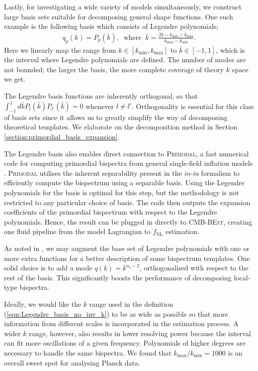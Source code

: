 Lastly, for investigating a wide variety of models simultaneously, we construct large basis sets suitable for decomposing general shape functions. One such example is the following basis which consists of Legendre polynomials;
\begin{align}
	q_p(k) = P_p(\bar{k}), \;\;\text{where}\;\; \bar{k} = \frac{2k-k_\text{min}-k_\text{max}}{k_\text{max}-k_\text{min}}.  \label{eqn:Legendre_basis_no_inv_k}
\end{align}
Here we linearly map the range from $k \in [k_\text{min},k_\text{max}]$ to $\bar{k} \in [-1,1]$, which is the interval where Legendre polynomials are defined. The number of modes are not bounded; the larger the basis, the more complete coverage of theory $k$ space we get.

The Legendre basis functions are inherently orthogonal, so that $\int_{-1}^{1} d\bar{k} P_{l}(\bar{k}) P_{l'}(\bar{k}) = 0$ whenever $l \neq l'$. Orthogonality is essential for this class of basis sets since it allows us to greatly simplify the way of decomposing theoretical templates. We elaborate on the decomposition method in Section \ref{section:primordial_basis_expansion}. 

The Legendre basis also enables direct connection to \textsc{Primodal}, a fast numerical code for computing primordial bispectra from general single-field inflation models \cite{Clarke2021}. \textsc{Primodal} utilises the inherent separability present in the \textit{in-in} formalism to efficiently compute the bispectrum using a separable basis. Using the Legendre polynomials for the basis is optimal for this step, but the methodology is not restricted to any particular choice of basis. The code then outputs the expansion coefficients of the primordial bispectrum with respect to the Legendre polynomials. Hence, the result can be plugged in directly to \textsc{CMB-BEst}, creating one fluid pipeline from the model Lagrangian to $f_\text{NL}$ estimation.

As noted in \cite{Clarke2021}, we may augment the base set of Legendre polynomials with one or more extra functions for a better description of some bispectrum templates. One solid choice is to add a mode $q(k) = k^{n_\text{s} -2}$, orthogonalised with respect to the rest of the basis. This significantly boosts the performance of decomposing local-type bispectra.

Ideally, we would like the $k$ range used in the definition (\ref{eqn:Legendre_basis_no_inv_k}) to be as wide as possible so that more information from different scales is incorporated in the estimation process. A wider $k$ range, however, also results in lower resolving power because the interval can fit more oscillations of a given frequency. Polynomials of higher degrees are necessary to handle the same bispectra. We found that $k_\text{max}/k_\text{min} = 1000$ is an overall sweet spot for analysing Planck data.

